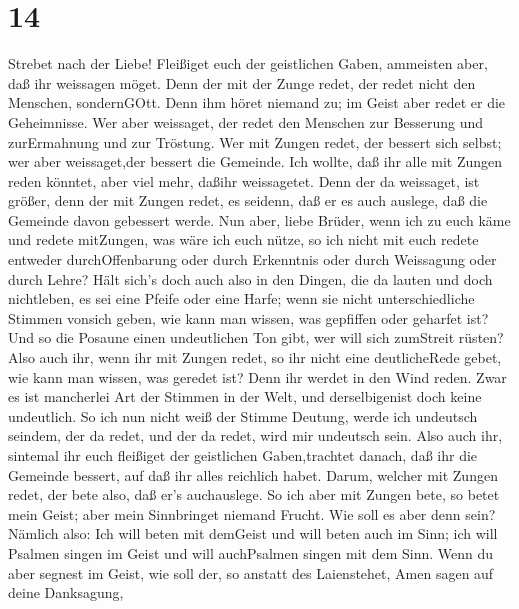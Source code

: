 \hypertarget{section-13}{%
\section{14}\label{section-13}}

 Strebet nach der Liebe! Fleißiget euch der geistlichen
Gaben, ammeisten aber, daß ihr weissagen möget.  Denn der
mit der Zunge redet, der redet nicht den Menschen, sondernGOtt. Denn ihm
höret niemand zu; im Geist aber redet er die Geheimnisse. 
Wer aber weissaget, der redet den Menschen zur Besserung und
zurErmahnung und zur Tröstung.  Wer mit Zungen redet, der
bessert sich selbst; wer aber weissaget,der bessert die Gemeinde.
 Ich wollte, daß ihr alle mit Zungen reden könntet, aber
viel mehr, daßihr weissagetet. Denn der da weissaget, ist größer, denn
der mit Zungen redet, es seidenn, daß er es auch auslege, daß die
Gemeinde davon gebessert werde.  Nun aber, liebe Brüder,
wenn ich zu euch käme und redete mitZungen, was wäre ich euch nütze, so
ich nicht mit euch redete entweder durchOffenbarung oder durch
Erkenntnis oder durch Weissagung oder durch Lehre?  Hält
sich's doch auch also in den Dingen, die da lauten und doch nichtleben,
es sei eine Pfeife oder eine Harfe; wenn sie nicht unterschiedliche
Stimmen vonsich geben, wie kann man wissen, was gepfiffen oder geharfet
ist?  Und so die Posaune einen undeutlichen Ton gibt, wer
will sich zumStreit rüsten?  Also auch ihr, wenn ihr mit
Zungen redet, so ihr nicht eine deutlicheRede gebet, wie kann man
wissen, was geredet ist? Denn ihr werdet in den Wind reden.
 Zwar es ist mancherlei Art der Stimmen in der Welt, und
derselbigenist doch keine undeutlich.  So ich nun nicht
weiß der Stimme Deutung, werde ich undeutsch seindem, der da redet, und
der da redet, wird mir undeutsch sein.  Also auch ihr,
sintemal ihr euch fleißiget der geistlichen Gaben,trachtet danach, daß
ihr die Gemeinde bessert, auf daß ihr alles reichlich habet.
 Darum, welcher mit Zungen redet, der bete also, daß er's
auchauslege.  So ich aber mit Zungen bete, so betet mein
Geist; aber mein Sinnbringet niemand Frucht.  Wie soll es
aber denn sein? Nämlich also: Ich will beten mit demGeist und will beten
auch im Sinn; ich will Psalmen singen im Geist und will auchPsalmen
singen mit dem Sinn.  Wenn du aber segnest im Geist, wie
soll der, so anstatt des Laienstehet, Amen sagen auf deine Danksagung,
